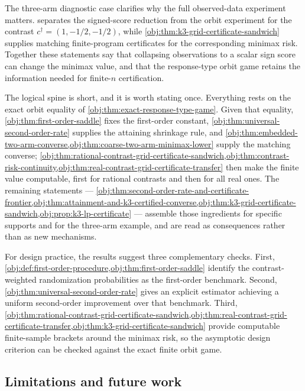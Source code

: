 \documentclass[11pt]{article}
\begin{document}
The three-arm diagnostic case clarifies why the full observed-data experiment matters.  separates the signed-score reduction from the orbit experiment for the contrast \(c^\dagger=(1,-1/2,-1/2)\), while \cref{obj:thm:k3-grid-certificate-sandwich} supplies matching finite-program certificates for the corresponding minimax risk. Together these statements say that collapsing observations to a scalar sign score can change the minimax value, and that the response-type orbit game retains the information needed for finite-\(n\) certification.

The logical spine is short, and it is worth stating once. Everything rests on the exact orbit equality of \cref{obj:thm:exact-response-type-game}. Given that equality, \cref{obj:thm:first-order-saddle} fixes the first-order constant, \cref{obj:thm:universal-second-order-rate} supplies the attaining shrinkage rule, and \cref{obj:thm:embedded-two-arm-converse,obj:thm:coarse-two-arm-minimax-lower} supply the matching converse; \cref{obj:thm:rational-contrast-grid-certificate-sandwich,obj:thm:contrast-risk-continuity,obj:thm:real-contrast-grid-certificate-transfer} then make the finite value computable, first for rational contrasts and then for all real ones. The remaining statements --- \cref{obj:thm:second-order-rate-and-certificate-frontier,obj:thm:attainment-and-k3-certified-converse,obj:thm:k3-grid-certificate-sandwich,obj:prop:k3-lp-certificate} --- assemble those ingredients for specific supports and for the three-arm example, and are read as consequences rather than as new mechanisms.

For design practice, the results suggest three complementary checks. First, \cref{obj:def:first-order-procedure,obj:thm:first-order-saddle} identify the contrast-weighted randomization probabilities as the first-order benchmark. Second, \cref{obj:thm:universal-second-order-rate} gives an explicit estimator achieving a uniform second-order improvement over that benchmark. Third, \cref{obj:thm:rational-contrast-grid-certificate-sandwich,obj:thm:real-contrast-grid-certificate-transfer,obj:thm:k3-grid-certificate-sandwich} provide computable finite-sample brackets around the minimax risk, so the asymptotic design criterion can be checked against the exact finite orbit game.

\subsection{Limitations and future work}
\end{document}
